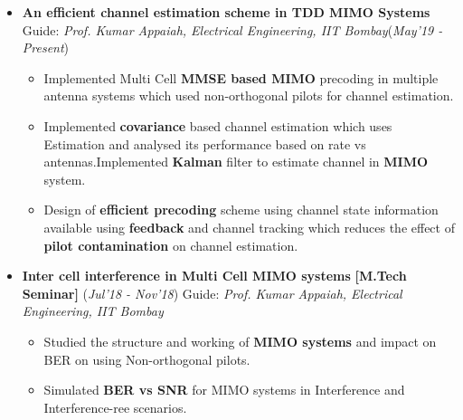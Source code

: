 \documentclass[10pt]{article}
\begin{document}

\vspace*{115pt}    %

\colorbox{bl}{}%

\begin{itemize}[leftmargin=0.4cm]


\item \textbf{An efficient channel estimation scheme in TDD MIMO Systems}
Guide: \textit{Prof. Kumar Appaiah, Electrical Engineering, IIT Bombay}\hfill{(\textit{May’19 - Present})}
    \begin{itemize}[leftmargin=0.5cm]
    \item Implemented Multi Cell \textbf{MMSE based MIMO }precoding in multiple antenna systems which used
non-orthogonal pilots for channel estimation.
    \item Implemented \textbf{covariance} based channel estimation which uses  Estimation and analysed its performance based on rate vs antennas.Implemented \textbf{Kalman} filter to estimate channel in \textbf{MIMO} system.
    \item  Design of \textbf{efficient precoding }scheme using channel state information available using \textbf{feedback} and channel
tracking which reduces the effect of \textbf{pilot contamination} on channel estimation.

    \end{itemize}



\item \textbf{Inter cell interference in Multi Cell MIMO systems
} \textbf{[M.Tech Seminar]}
\hfill{(\textit{Jul'18 - Nov'18})}
Guide: \textit{Prof. Kumar Appaiah, Electrical Engineering, IIT Bombay}
    \begin{itemize}
    \item Studied the structure and working of \textbf{MIMO systems} and impact on BER on using Non-orthogonal pilots.
    \item Simulated \textbf{BER vs SNR} for MIMO systems in Interference and Interference-ree scenarios.

    \end{itemize}
    
\end{itemize}
\end{document}
